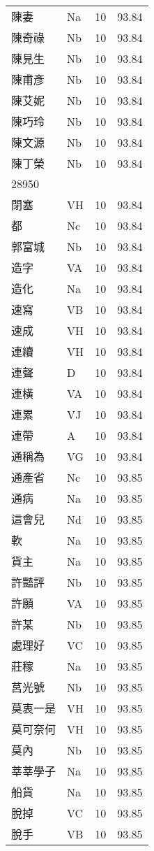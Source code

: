 \documentclass[twocolumn]{book}
\begin{document}
\begin{supertabular}{llrr}
陳妻 & Na & 10 &  93.84\\
陳奇祿 & Nb & 10 &  93.84\\
陳見生 & Nb & 10 &  93.84\\
陳甫彥 & Nb & 10 &  93.84\\
陳艾妮 & Nb & 10 &  93.84\\
陳巧玲 & Nb & 10 &  93.84\\
陳文源 & Nb & 10 &  93.84\\
陳丁榮 & Nb & 10 &  93.84\\
28950\\
閉塞 & VH & 10 &  93.84\\
都 & Nc & 10 &  93.84\\
郭富城 & Nb & 10 &  93.84\\
造字 & VA & 10 &  93.84\\
造化 & Na & 10 &  93.84\\
速寫 & VB & 10 &  93.84\\
速成 & VH & 10 &  93.84\\
連續 & VH & 10 &  93.84\\
連聲 & D & 10 &  93.84\\
連橫 & VA & 10 &  93.84\\
連累 & VJ & 10 &  93.84\\
連帶 & A & 10 &  93.84\\
通稱為 & VG & 10 &  93.84\\
通產省 & Nc & 10 &  93.85\\
通病 & Na & 10 &  93.85\\
這會兒 & Nd & 10 &  93.85\\
軟 & Na & 10 &  93.85\\
貨主 & Na & 10 &  93.85\\
許豔評 & Nb & 10 &  93.85\\
許願 & VA & 10 &  93.85\\
許某 & Nb & 10 &  93.85\\
處理好 & VC & 10 &  93.85\\
莊稼 & Na & 10 &  93.85\\
莒光號 & Nb & 10 &  93.85\\
莫衷一是 & VH & 10 &  93.85\\
莫可奈何 & VH & 10 &  93.85\\
莫內 & Nb & 10 &  93.85\\
莘莘學子 & Na & 10 &  93.85\\
船貨 & Na & 10 &  93.85\\
脫掉 & VC & 10 &  93.85\\
脫手 & VB & 10 &  93.85\\

\end{supertabular}
\end{document}
